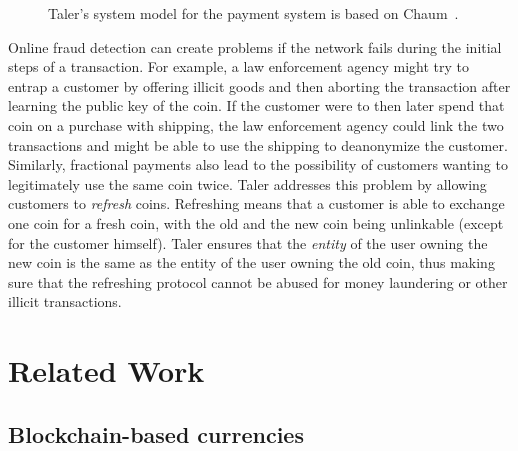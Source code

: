 \documentclass{llncs}
\begin{document}
\begin{figure}[h]
\centering
{}
\caption{Taler's system model for the payment system is based on Chaum~\cite{chaum1983blind}.}
\label{fig:cmm}
\end{figure}

Online fraud detection can create problems if the network fails during
the initial steps of a transaction.  For example, a law enforcement
agency might try to entrap a customer by offering illicit goods and
then aborting the transaction after learning the public key of the
coin.  If the customer were to then later spend that coin on a
purchase with shipping, the law enforcement agency could link the two
transactions and might be able to use the shipping to deanonymize the
customer.  Similarly, fractional payments also lead to the
possibility of customers wanting to legitimately use the same coin
twice.  Taler addresses this problem by allowing customers to {\em
  refresh} coins.  Refreshing means that a customer is able to
exchange one coin for a fresh coin, with the old and the new coin
being unlinkable (except for the customer himself).  Taler ensures
that the {\em entity} of the user owning the new coin is the same as the
entity of the user owning the old coin, thus making sure that the
refreshing protocol cannot be abused for money laundering or other
illicit transactions.


\section{Related Work}

\subsection{Blockchain-based currencies}
\end{document}
